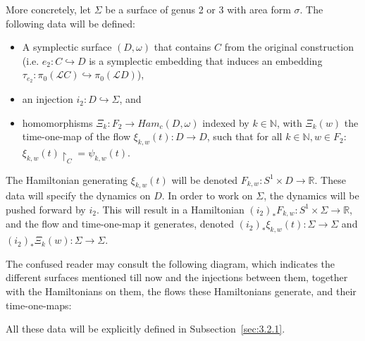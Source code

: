 \documentclass[11pt]{article}
\newcommand{\R}{\mathbb{R}}
\newcommand{\N}{\mathbb{N}}
\begin{document}
        More concretely, let $\Sigma$ be a surface of genus 2 or 3 with area form $\sigma$. The following data will be defined:
        \begin{itemize}
            \item A symplectic surface $(D,\omega)$ that contains $C$ from the original construction (i.e. $e_2: C \hookrightarrow D$ is a symplectic embedding that induces an embedding $\tau_{e_2}: \pi_0(\mathscr{L}C) \hookrightarrow \pi_0(\mathscr{L}D)$),
            \item an injection $i_2: D \hookrightarrow \Sigma$, and 
            \item homomorphisms $\Xi_k: F_2 \to Ham_c(D, \omega)$ indexed by $k \in \N$, with $\Xi_k(w)$ the time-one-map of the flow $\xi_{k,w}(t): D \to D$, such that for all $k \in \N, w \in F_2$: $\xi_{k,w}(t) \restriction_C = \psi_{k,w}(t)$.
        \end{itemize}
        The Hamiltonian generating $\xi_{k,w}(t)$ will be denoted $F_{k,w}: S^1 \times D \to \R$. These data will specify the dynamics on $D$. In order to work on $\Sigma$, the dynamics will be pushed forward by $i_2$. This will result in a Hamiltonian $(i_2)_* F_{k,w}: S^1 \times \Sigma \to \R$, and the flow and time-one-map it generates, denoted $(i_2)_* \xi_{k,w}(t): \Sigma \to \Sigma$ and $(i_2)_* \Xi_k(w): \Sigma \to \Sigma$.
        
        The confused reader may consult the following diagram, which indicates the different surfaces mentioned till now and the injections between them, together with the Hamiltonians on them, the flows these Hamiltonians generate, and their time-one-maps:
        
        \begin{center}\end{center}
        
        All these data will be explicitly defined in Subsection~\ref{sec:3.2.1}. \\
        
\end{document}
